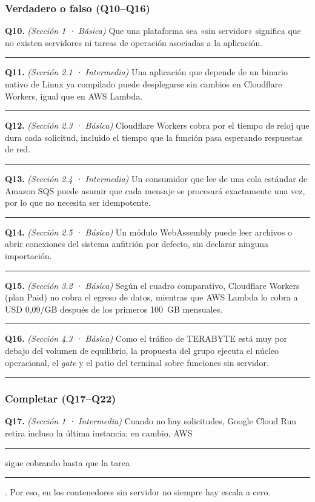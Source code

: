 \documentclass[12pt, letterpaper, table, xcdraw]{inf-pucv}
\begin{document}
\subsubsection*{Verdadero o falso (Q10--Q16)}

\textbf{Q10.} \textit{(Sección 1 · Básica)} Que una plataforma sea «sin servidor» significa que no existen servidores ni tareas de operación asociadas a la aplicación. \rule{2.2cm}{0.4pt}

\textbf{Q11.} \textit{(Sección 2.1 · Intermedia)} Una aplicación que depende de un binario nativo de Linux ya compilado puede desplegarse sin cambios en Cloudflare Workers, igual que en AWS Lambda. \rule{2.2cm}{0.4pt}

\textbf{Q12.} \textit{(Sección 2.3 · Básica)} Cloudflare Workers cobra por el tiempo de reloj que dura cada solicitud, incluido el tiempo que la función pasa esperando respuestas de red. \rule{2.2cm}{0.4pt}

\textbf{Q13.} \textit{(Sección 2.4 · Intermedia)} Un consumidor que lee de una cola estándar de Amazon SQS puede asumir que cada mensaje se procesará exactamente una vez, por lo que no necesita ser idempotente. \rule{2.2cm}{0.4pt}

\textbf{Q14.} \textit{(Sección 2.5 · Básica)} Un módulo WebAssembly puede leer archivos o abrir conexiones del sistema anfitrión por defecto, sin declarar ninguna importación. \rule{2.2cm}{0.4pt}

\textbf{Q15.} \textit{(Sección 3.2 · Básica)} Según el cuadro comparativo, Cloudflare Workers (plan Paid) no cobra el egreso de datos, mientras que AWS Lambda lo cobra a USD 0,09/GB después de los primeros 100~GB mensuales. \rule{2.2cm}{0.4pt}

\textbf{Q16.} \textit{(Sección 4.3 · Básica)} Como el tráfico de TERABYTE está muy por debajo del volumen de equilibrio, la propuesta del grupo ejecuta el núcleo operacional, el \emph{gate} y el patio del terminal sobre funciones sin servidor. \rule{2.2cm}{0.4pt}

\subsubsection*{Completar (Q17--Q22)}

\textbf{Q17.} \textit{(Sección 1 · Intermedia)} Cuando no hay solicitudes, Google Cloud Run retira incluso la última instancia; en cambio, AWS \rule{2.2cm}{0.4pt} sigue cobrando hasta que la tarea \rule{2.2cm}{0.4pt}. Por eso, en los contenedores sin servidor no siempre hay escala a cero.
\end{document}
